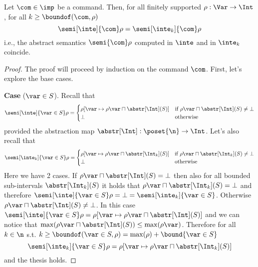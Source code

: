 
\begin{lemma}
  Let \(\com\in \imp\) be a command. Then, for all finitely supported
  \(\rho : \Var \to \Int\), for all \(k\geq \boundof(\com,\rho)\)
  \begin{equation*}
    \semi[\inte]{\com}\rho = \semi[\inte_k]{\com}\rho
  \end{equation*}
  i.e., the abstract semantics \(\semi{\com} \rho \)
  computed in \(\inte\) and in \(\inte_k\) coincide.
\end{lemma}

\begin{proof}

  The proof will proceed by induction on the command \(\com\). First,
  let's explore the base cases.

  \medskip
  
  \noindent
  \textbf{Case} (\(\var \in S\)).
  Recall that
  \begin{equation*}
    \semi[\inte]{\var \in S}\rho = \begin{cases}
      \rho[\var \mapsto \rho\var \sqcap \abstr[\Int](S)] & \text{if } \rho\var \sqcap \abstr[\Int](S) \neq \bot \\
      \bot & \text{otherwise}
    \end{cases}
  \end{equation*}
  provided the abstraction map
  \({\abstr[\Int] : \poset{\n} \to \Int}\). Let's also recall that
  \begin{equation*}
    \semi[\inte_k]{\var \in S}\rho = \begin{cases}
      \rho[\var \mapsto \rho\var \sqcap \abstr[\Int_k](S)] & \text{if } \rho\var \sqcap \abstr[\Int_k](S) \neq \bot \\
      \bot & \text{otherwise}
    \end{cases}
  \end{equation*}
  Here we have 2 cases. If
  \({\rho\var \sqcap \abstr[\Int](S) = \bot}\) then also for all
  bounded sub-intervals \(\abstr[\Int_k](S)\) it holds that
  \({\rho\var \sqcap \abstr[\Int_k](S) = \bot}\) and therefore
  \({\semi[\inte]{\var\in S}\rho = \bot = \semi[\inte_k]{\var \in
      S}}\). Otherwise
  \({\rho\var \sqcap \abstr[\Int](S) \neq \bot}\). In this case
  \({\semi[\inte]{\var \in S}\rho = \rho[\var \mapsto \rho\var \sqcap
    \abstr[\Int](S)]}\) and we can notice that
  \(\max(\rho\var \sqcap \abstr[\Int](S)) \leq
  \max(\rho\var)\). Therefore for all \(k\in\n\) s.t.
  \({k\geq \boundof(\var \in S, \rho) = \max(\rho) + \bound{\var\in
      S}}\)
  \begin{equation*}
    \semi[\inte_k]{\var \in S}\rho = \rho[\var \mapsto \rho\var \sqcap \abstr[\Int_k](S)]
  \end{equation*}
  and the thesis holds.


\end{proof}
